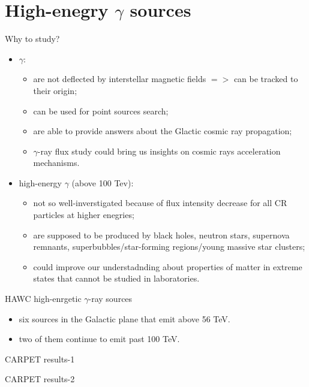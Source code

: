 
\begin{frame}
\titlepage
\end{frame}

\section{High-enegry $\gamma$ sources}

\begin{frame}{Why to study?}
\begin{itemize}
 \item $\gamma$:
\begin{itemize}
 \item are not deflected by interstellar magnetic fields $=>$ can be tracked to their origin;
 \item can be used for point sources search;
 \item are able to provide answers about the Glactic cosmic ray propagation;
 \item $\gamma$-ray flux study could bring us insights on cosmic rays acceleration mechanisms.
\end{itemize}
\item high-energy $\gamma$ (above 100 Tev):
\begin{itemize}
 \item not so well-inverstigated because of flux intensity decrease for all CR particles at higher enegries;
 \item are supposed to be produced by black holes, neutron stars, supernova remnants, superbubbles/star-forming
regions/young massive star clusters;
 \item could improve our understadnding about properties of matter in extreme states that cannot be studied in laboratories.
\end{itemize}

\end{itemize}
\end{frame}

\begin{frame}{HAWC high-enrgetic $\gamma$-ray sources}

\begin{itemize}
  \item six sources in the Galactic plane that emit above 56 TeV. 
  \item two of them continue to emit past 100 TeV. 
\end{itemize}

\end{frame}

\begin{frame}{CARPET results-1}
 
\end{frame}

\begin{frame}{CARPET results-2}
 
\end{frame}
